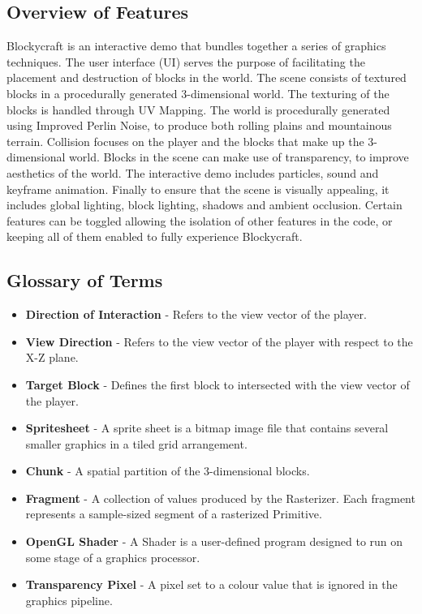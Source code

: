 \documentclass[a4paper,11pt,titlepage]{scrartcl}
\newcommand{\Blockycraft}{Blockycraft}
\begin{document}
\subsection{Overview of Features}
\Blockycraft{} is an interactive demo that bundles together a series of graphics techniques. The user interface (UI) serves the purpose of facilitating the placement and destruction of blocks in the world. The scene consists of textured blocks in a procedurally generated 3-dimensional world. The texturing of the blocks is handled through UV Mapping. The world is procedurally generated using Improved Perlin Noise, to produce both rolling plains and mountainous terrain. Collision focuses on the player and the blocks that make up the 3-dimensional world. Blocks in the scene can make use of transparency, to improve aesthetics of the world. The interactive demo includes particles, sound and keyframe animation. Finally to ensure that the scene is visually appealing, it includes global lighting, block lighting, shadows and ambient occlusion. Certain features can be toggled allowing the isolation of other features in the code, or keeping all of them enabled to fully experience \Blockycraft{}.

\subsection{Glossary of Terms}
\begin{itemize}
\item \textbf{Direction of Interaction} - Refers to the view vector of the player.
\item \textbf{View Direction} - Refers to the view vector of the player with respect to the X-Z plane.
\item \textbf{Target Block} - Defines the first block to intersected with the view vector of the player.
\item \textbf{Spritesheet} - A sprite sheet is a bitmap image file that contains several smaller graphics in a tiled grid arrangement.
\item \textbf{Chunk} - A spatial partition of the 3-dimensional blocks.
\item \textbf{Fragment} - A collection of values produced by the Rasterizer. Each fragment represents a sample-sized segment of a rasterized Primitive.
\item \textbf{OpenGL Shader} - A Shader is a user-defined program designed to run on some stage of a graphics processor.
\item \textbf{Transparency Pixel} -  A pixel set to a colour value that is ignored in the graphics pipeline.
\end{itemize}
\end{document}
